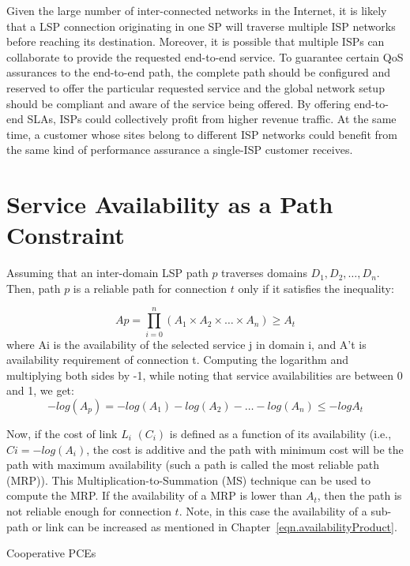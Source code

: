 Given the large number of inter-connected networks in the Internet, it is likely that a LSP connection originating in one SP will traverse multiple ISP networks before reaching its destination. Moreover, it is possible that multiple ISPs can collaborate to provide the requested end-to-end service. To guarantee certain QoS assurances to the end-to-end path, the complete path should be configured and reserved to offer the particular requested service and the global network setup should be compliant and aware of the service being offered. By offering end-to-end SLAs, ISPs could collectively profit from higher revenue traffic. At the same time, a customer whose sites belong to different ISP networks could benefit from the same kind of performance assurance a single-ISP customer receives.

\section{Service Availability as a Path Constraint}
Assuming that an inter-domain LSP path $p$ traverses domains $D_1, D_2, \ldots, D_n$. Then, path $p$ is a reliable path for connection $t$ only if it satisfies the inequality:

\begin{equation}
\label{eqn.availabilityProduct}
 Ap = \prod_{i=0}^{n}\left({A_1\times A_2 \times \ldots \times A_n}\right) \geq A_t
\end{equation}
where Ai is the availability of the selected service j in domain i, and A't is availability requirement of connection t. Computing the logarithm and multiplying both sides by -1, while noting that service availabilities are between 0 and 1, we get:
\begin{equation}
-log(A_p) = -log(A_1) - log(A_2) - \ldots - log(A_n) \leq -logA_t
\end{equation}

Now, if the cost of link $L_i$ $(C_i)$ is defined as a function of its availability (i.e., $Ci = -log(A_i)$, the cost is additive and the path with minimum cost will be the path with maximum availability (such a path is called the most reliable path (MRP)). This Multiplication-to-Summation (MS) technique can be used to compute the MRP. If the availability of a MRP is lower than $A_t$, then the path is not reliable enough for connection $t$. Note, in this case the availability of a sub-path or link can be increased as mentioned in Chapter~\ref{eqn.availabilityProduct}. 

Cooperative PCEs

